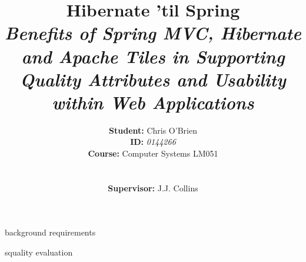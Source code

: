 \documentclass[a4paper,11pt,fleqn]{report}
\begin{document}
\title{Hibernate 'til Spring \\ \textit{Benefits of Spring MVC, Hibernate and Apache Tiles in Supporting Quality Attributes and Usability within Web Applications}}
\author{\textbf{Student:} Chris O'Brien \\ \textbf{ID:} \textit{0144266} \\ \textbf{Course:} Computer Systems LM051 \\ \\ \\ \textbf{Supervisor:} J.J. Collins}
\maketitle

\begin{abstract}      

\end{abstract}        

%
%
\tableofcontents

%
%
\listoffigures

%
%
\listoftables


 {background}
 {requirements}


 {squality}
 {evaluation}

\printbibliography[title={References}]
\appendix

\end{document}
